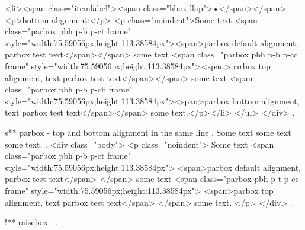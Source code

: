 <li><span class="itemlabel"><span class="hbox llap">•</span></span>
<p>bottom alignment:</p>
<p class="noindent">Some text <span class="parbox pbh p-b p-ct frame" style="width:75.59056px;height:113.38584px"><span>parbox default alignment, parbox test text</span></span> some text <span class="parbox pbh p-b p-cc frame" style="width:75.59056px;height:113.38584px"><span>parbox top alignment, text parbox test text</span></span> some text <span class="parbox pbh p-b p-cb frame" style="width:75.59056px;height:113.38584px"><span>parbox bottom alignment, text parbox test text</span></span> some text.</p></li>
</ul>
</div>
.


s** parbox - top and bottom alignment in the same line
.
\noindent
Some text
some text
some text.
.
<div class="body">
<p class="noindent">
Some text <span class="parbox pbh p-b p-ct frame" style="width:75.59056px;height:113.38584px">
<span>parbox default alignment, parbox test text</span>
</span> some text <span class="parbox pbh p-t p-cc frame" style="width:75.59056px;height:113.38584px">
<span>parbox top alignment, text parbox test text</span>
</span> some text.
</p>
</div>
.


!** raisebox
.
.
.